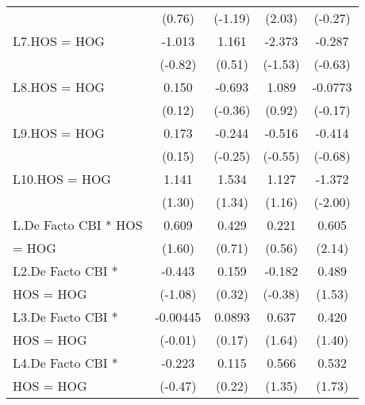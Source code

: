 {\begin{tabular}{l*{4}{c}}
                    &      (0.76)         &     (-1.19)         &      (2.03)         &     (-0.27)         \\
[1em]
L7.HOS = HOG        &      -1.013         &       1.161         &      -2.373         &      -0.287         \\
                    &     (-0.82)         &      (0.51)         &     (-1.53)         &     (-0.63)         \\
[1em]
L8.HOS = HOG        &       0.150         &      -0.693         &       1.089         &     -0.0773         \\
                    &      (0.12)         &     (-0.36)         &      (0.92)         &     (-0.17)         \\
[1em]
L9.HOS = HOG        &       0.173         &      -0.244         &      -0.516         &      -0.414         \\
                    &      (0.15)         &     (-0.25)         &     (-0.55)         &     (-0.68)         \\
[1em]
L10.HOS = HOG       &       1.141         &       1.534         &       1.127         &      -1.372\sym{*}  \\
                    &      (1.30)         &      (1.34)         &      (1.16)         &     (-2.00)         \\
[1em]
L.De Facto CBI * HOS&       0.609         &       0.429         &       0.221         &       0.605\sym{*}  \\
= HOG               &      (1.60)         &      (0.71)         &      (0.56)         &      (2.14)         \\
[1em]
L2.De Facto CBI *   &      -0.443         &       0.159         &      -0.182         &       0.489         \\
HOS = HOG           &     (-1.08)         &      (0.32)         &     (-0.38)         &      (1.53)         \\
[1em]
L3.De Facto CBI *   &    -0.00445         &      0.0893         &       0.637         &       0.420         \\
HOS = HOG           &     (-0.01)         &      (0.17)         &      (1.64)         &      (1.40)         \\
[1em]
L4.De Facto CBI *   &      -0.223         &       0.115         &       0.566         &       0.532         \\
HOS = HOG           &     (-0.47)         &      (0.22)         &      (1.35)         &      (1.73)         \\

\end{tabular}}

